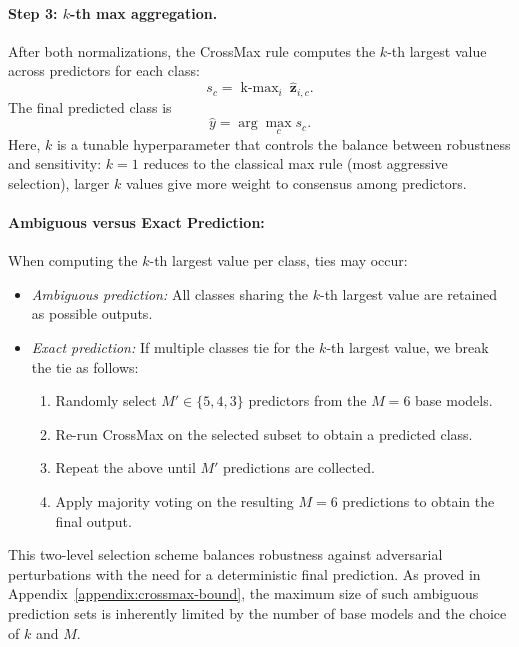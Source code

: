 \paragraph{Step 3: $k$-th max aggregation.}  
After both normalizations, the CrossMax rule computes the $k$-th largest value across predictors for each class:
\[
s_c = \operatorname{k\text{-}max}_{i} \ \hat{\mathbf{z}}_{i,c}.
\]
The final predicted class is
\[
\hat{y} = \arg\max_{c} s_c.
\]
Here, $k$ is a tunable hyperparameter that controls the balance between robustness and sensitivity: $k=1$ reduces to the classical max rule (most aggressive selection), larger $k$ values give more weight to consensus among predictors.

\paragraph{Ambiguous versus Exact Prediction:}
When computing the $k$-th largest value per class, ties may occur:
\begin{itemize}
    \item \emph{Ambiguous prediction:} All classes sharing the $k$-th largest value are retained as possible outputs.
    \item \emph{Exact prediction:} If multiple classes tie for the $k$-th largest value, we break the tie as follows:
    \begin{enumerate}
        \item Randomly select $M' \in \{5,4,3\}$ predictors from the $M=6$ base models.
        \item Re-run CrossMax on the selected subset to obtain a predicted class.
        \item Repeat the above until $M'$ predictions are collected.
        \item Apply majority voting on the resulting $M=6$ predictions to obtain the final output.
    \end{enumerate}
\end{itemize}
This two-level selection scheme balances robustness against adversarial perturbations with the need for a deterministic final prediction.  
As proved in Appendix~\ref{appendix:crossmax-bound}, the maximum size of such ambiguous prediction sets is inherently limited by the number of base models and the choice of $k$ and $M$.

